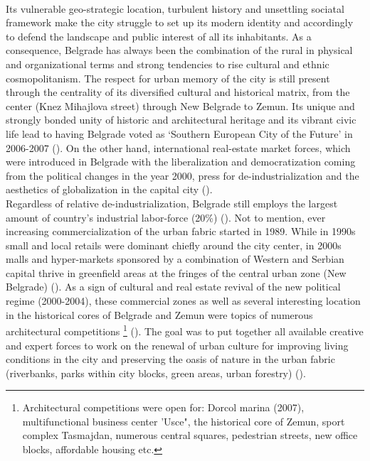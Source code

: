 \documentclass[11pt]{report}
\begin{document}
\\
Its vulnerable geo-strategic location, turbulent history and unsettling sociatal framework make the city struggle to set up its modern identity and accordingly to defend the landscape and public interest of all its inhabitants. As a consequence, Belgrade has always been the combination of the rural in physical and organizational terms and strong tendencies to rise cultural and ethnic cosmopolitanism.
The respect for urban memory of the city is still present through the centrality of its diversified cultural and historical matrix, from the center (Knez Mihajlova street) through New Belgrade to Zemun.
Its unique and strongly bonded unity of historic and architectural heritage and its vibrant civic life lead to having Belgrade voted as ‘Southern European City of the Future’ in 2006-2007 (\cite{(Hirt 2009)}).
On the other hand, international real-estate market forces, which were introduced in Belgrade with the liberalization and democratization coming from the political changes in the year 2000, press for de-industrialization and the aesthetics of globalization in the capital city (\cite{Grozdanic}).
\\
Regardless of relative de-industrialization, Belgrade  still  employs the largest amount of country’s industrial labor-force (20\%) (\cite{(Hirt 2009)}).
Not to mention, ever increasing commercialization of the urban fabric started in 1989.
While in 1990s small and local retails were dominant chiefly around the city center, in 2000s  malls and hyper-markets sponsored by a combination of Western and Serbian capital thrive in greenfield areas at the fringes of the central urban zone (New Belgrade) (\cite{(Hirt 2009)}).
As a sign of cultural and real estate revival of the new political regime (2000-2004), these commercial zones as well as several interesting location in the historical cores of Belgrade and Zemun were topics of numerous  architectural  competitions
\footnote{Architectural competitions were open for: Dorcol marina (2007), multifunctional business center 'Usce", the historical core of Zemun, sport complex Tasmajdan, numerous central squares, pedestrian streets, new office blocks, affordable housing etc.} %
(\cite{Stupar 2004 isocarp}).
The goal was to put together all available creative and expert forces to work on the renewal of urban culture for improving living conditions in the city and preserving the oasis of nature in the urban fabric (riverbanks, parks within city blocks, green areas, urban forestry) (\cite{Grozdanic}).
\end{document}
